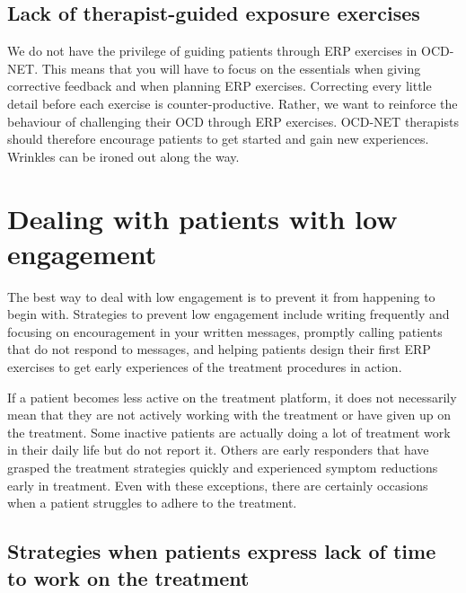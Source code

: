\documentclass[]{book}
\theoremstyle{definition}
\theoremstyle{definition}
\theoremstyle{definition}
\theoremstyle{remark}
\begin{document}
\hypertarget{lack-of-therapist-guided-exposure-exercises}{%
\subsection{Lack of therapist-guided exposure
exercises}\label{lack-of-therapist-guided-exposure-exercises}}

We do not have the privilege of guiding patients through ERP exercises
in OCD-NET. This means that you will have to focus on the essentials
when giving corrective feedback and when planning ERP exercises.
Correcting every little detail before each exercise is
counter-productive. Rather, we want to reinforce the behaviour of
challenging their OCD through ERP exercises. OCD-NET therapists should
therefore encourage patients to get started and gain new experiences.
Wrinkles can be ironed out along the way.

\hypertarget{dealing-with-patients-with-low-engagement}{%
\section{Dealing with patients with low
engagement}\label{dealing-with-patients-with-low-engagement}}

The best way to deal with low engagement is to prevent it from happening
to begin with. Strategies to prevent low engagement include writing
frequently and focusing on encouragement in your written messages,
promptly calling patients that do not respond to messages, and helping
patients design their first ERP exercises to get early experiences of
the treatment procedures in action.

If a patient becomes less active on the treatment platform, it does not
necessarily mean that they are not actively working with the treatment
or have given up on the treatment. Some inactive patients are actually
doing a lot of treatment work in their daily life but do not report it.
Others are early responders that have grasped the treatment strategies
quickly and experienced symptom reductions early in treatment. Even with
these exceptions, there are certainly occasions when a patient struggles
to adhere to the treatment.

\hypertarget{strategies-when-patients-express-lack-of-time-to-work-on-the-treatment}{%
\subsection{Strategies when patients express lack of time to work on the
treatment}\label{strategies-when-patients-express-lack-of-time-to-work-on-the-treatment}}
\end{document}
